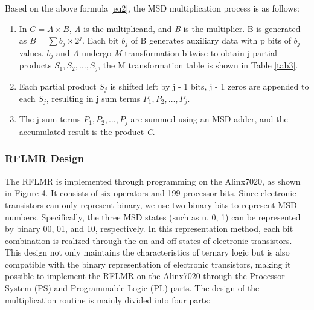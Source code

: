 \documentclass[electronics,article,accept,pdftex,moreauthors]{Definitions/mdpi}
\begin{document}
Based on the above formula \ref{eq2}, the MSD multiplication process is as follows:
\begin{enumerate}[label={\arabic*).}]
\item In $C=A \times B$,\textit{ A} is the multiplicand, and \textit{B} is the multiplier. B is generated as $B=\sum b_j       
      \times 2^j $. Each bit $b_j$ of B\textit{} generates auxiliary data with p bits of $b_j$ values. $b_j$ and \textit{A }undergo \textit{M} transformation bitwise to obtain j partial products $S_1, S_2,…, S_j$, the M transformation table is shown in Table \ref{tab3}.
\item  Each partial product $S_j$ is shifted left by j - 1 bits, j - 1 zeros are appended to each          $S_j$, resulting in j sum terms $P_1, P_2,…, P_j$.
\item The j sum terms $P_1, P_2,…, P_j$ are summed using an MSD adder, and the accumulated result   
      is the product \textit{C}.
\end{enumerate}


\begin{table}[H]
\caption{\textit{M} transformation}
\label{tab3}
{}
\captionsetup{justification=centering} 
\end{table}

\subsubsection{RFLMR Design}
The RFLMR is implemented through programming on the Alinx7020, as shown in Figure 4. It consists of six operators and 199 processor bits. Since electronic transistors can only represent binary, we use two binary bits to represent MSD numbers. Specifically, the three MSD states (such as u, 0, 1) can be represented by binary 00, 01, and 10, respectively. In this representation method, each bit combination is realized through the on-and-off states of electronic transistors. This design not only maintains the characteristics of ternary logic but is also compatible with the binary representation of electronic transistors, making it possible to implement the RFLMR on the Alinx7020 through the Processor System (PS) and Programmable Logic (PL) parts. The design of the multiplication routine is mainly divided into four parts:
\end{document}
